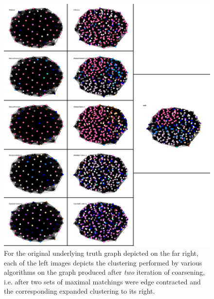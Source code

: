 \documentclass{article}
\begin{document}
\begin{figure}[H]
    \label{fig:results_contracted-2}
    \centering
    \includegraphics[width=1.0\textwidth]{results/results_contracted-2.png}
    \caption[Coarsened clustering for two iterations on $p=0.90,q=0.15$]{For the original underlying truth graph depicted on the far right, each of the left images depicts the clustering performed by various algorithms on the graph produced after \textit{two} iteration of coarsening, i.e. after two sets of maximal matchings were edge contracted and the corresponding expanded clustering to its right.}
\end{figure}
\end{document}
